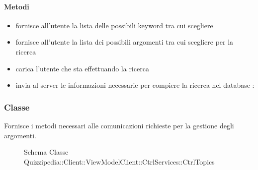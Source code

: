\paragraph{Metodi}
\begin{itemize}
\item {}
\newline
fornisce all'utente la lista delle possibili keyword tra cui scegliere
\newline
\item {}
\newline
fornisce all'utente la lista dei possibili argomenti tra cui scegliere per la ricerca
\newline
\item {}
\newline
carica l'utente che sta effettuando la ricerca
\newline
\item {}
\newline
invia al server le informazioni necessarie per compiere la ricerca nel database
\newline
{} :
\end{itemize}
\subsubsection{Classe }
Fornisce i metodi necessari alle comunicazioni richieste per la gestione degli argomenti.
\begin{figure}[H]
\centering
\noindent{}
\caption[Schema Classe CtrlTopics]{Schema Classe Quizzipedia::Client::ViewModelClient::CtrlServices::CtrlTopics}
\end{figure}
